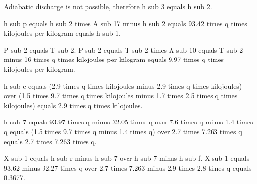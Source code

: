 Adiabatic discharge is not possible, therefore h sub 3 equals h sub 2.

h sub p equals h sub 2 times A sub 17 minus h sub 2 equals 93.42 times q times kilojoules per kilogram equals h sub 1.

P sub 2 equals T sub 2. P sub 2 equals T sub 2 times A sub 10 equals T sub 2 minus 16 times q times kilojoules per kilogram equals 9.97 times q times kilojoules per kilogram.

h sub c equals (2.9 times q times kilojoules minus 2.9 times q times kilojoules) over (1.5 times 9.7 times q times kilojoules minus 1.7 times 2.5 times q times kilojoules) equals 2.9 times q times kilojoules.

h sub 7 equals 93.97 times q minus 32.05 times q over 7.6 times q minus 1.4 times q equals (1.5 times 9.7 times q minus 1.4 times q) over 2.7 times 7.263 times q equals 2.7 times 7.263 times q.

X sub 1 equals h sub r minus h sub 7 over h sub 7 minus h sub f. X sub 1 equals 93.62 minus 92.27 times q over 2.7 times 7.263 minus 2.9 times 2.8 times q equals 0.3677.
